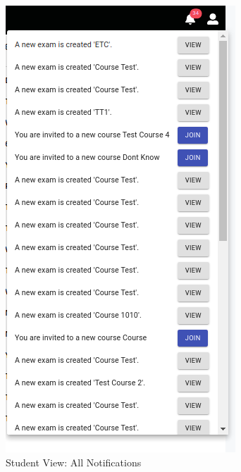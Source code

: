 \documentclass[10pt]{article}
\begin{document}
\begin{figure}[H]
  \centering
  \centerline{\includegraphics[width=\textwidth,height=0.8\textheight ]{studnt/notifications.png}}
  \caption{Student View: All Notifications}
  \label{fig}
\end{figure}
\end{document}
